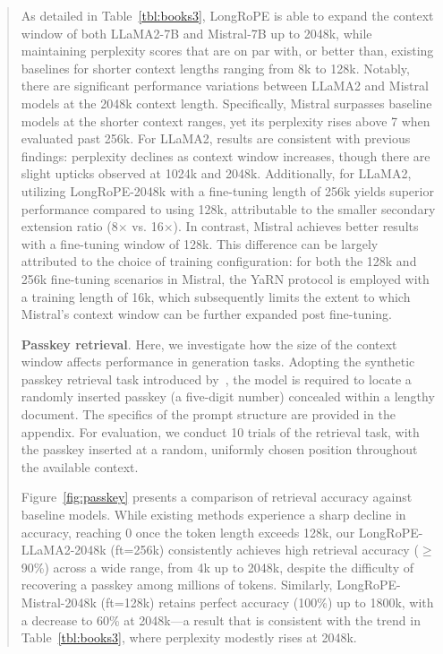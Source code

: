 \begin{abstract}
As detailed in Table~\ref{tbl:books3}, LongRoPE is able to expand the context window of both LLaMA2-7B and Mistral-7B up to 2048k, while maintaining perplexity scores that are on par with, or better than, existing baselines for shorter context lengths ranging from 8k to 128k. Notably, there are significant performance variations between LLaMA2 and Mistral models at the 2048k context length. Specifically, Mistral surpasses baseline models at the shorter context ranges, yet its perplexity rises above 7 when evaluated past 256k. For LLaMA2, results are consistent with previous findings: perplexity declines as context window increases, though there are slight upticks observed at 1024k and 2048k. Additionally, for LLaMA2, utilizing LongRoPE-2048k with a fine-tuning length of 256k yields superior performance compared to using 128k, attributable to the smaller secondary extension ratio (8$\times$ vs. 16$\times$). In contrast, Mistral achieves better results with a fine-tuning window of 128k. This difference can be largely attributed to the choice of training configuration: for both the 128k and 256k fine-tuning scenarios in Mistral, the YaRN protocol is employed with a training length of 16k, which subsequently limits the extent to which Mistral’s context window can be further expanded post fine-tuning.

\textbf{Passkey retrieval}. Here, we investigate how the size of the context window affects performance in generation tasks. Adopting the synthetic passkey retrieval task introduced by~\cite{passkey}, the model is required to locate a randomly inserted passkey (a five-digit number) concealed within a lengthy document. The specifics of the prompt structure are provided in the appendix. For evaluation, we conduct 10 trials of the retrieval task, with the passkey inserted at a random, uniformly chosen position throughout the available context.

Figure~\ref{fig:passkey} presents a comparison of retrieval accuracy against baseline models. While existing methods experience a sharp decline in accuracy, reaching 0 once the token length exceeds 128k, our LongRoPE-LLaMA2-2048k (ft=256k) consistently achieves high retrieval accuracy ($\ge$90\%) across a wide range, from 4k up to 2048k, despite the difficulty of recovering a passkey among millions of tokens. Similarly, LongRoPE-Mistral-2048k (ft=128k) retains perfect accuracy (100\%) up to 1800k, with a decrease to 60\% at 2048k—a result that is consistent with the trend in Table~\ref{tbl:books3}, where perplexity modestly rises at 2048k.


\end{abstract}

